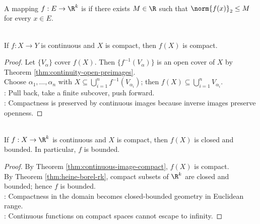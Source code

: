 \begin{definition} \label{def:bounded-mapping-into-rk} \\
A mapping $f:E\to\R^k$ is  if there exists $M\in\R$ such that $\norm{f(x)}_2\leq M$ for every $x\in E$.
\end{definition}

\begin{theorem} \label{thm:continuous-image-compact} \\
If $f:X\to Y$ is continuous and $X$ is compact, then $f(X)$ is compact.
\begin{proof}
Let $\{V_\alpha\}$ cover $f(X)$. Then $\{f^{-1}(V_\alpha)\}$ is an open cover of $X$ by Theorem \ref{thm:continuity-open-preimages}.\\
Choose $\alpha_1,\ldots,\alpha_n$ with $X\subseteq\bigcup_{i=1}^n f^{-1}(V_{\alpha_i})$; then $f(X)\subseteq\bigcup_{i=1}^n V_{\alpha_i}$.\\
: Pull back, take a finite subcover, push forward.\\
: Compactness is preserved by continuous images because inverse images preserve openness.
\end{proof}
\end{theorem}

\begin{corollary} \label{cor:continuous-rk-image-compact-closed-bounded} \\
If $f:X\to\R^k$ is continuous and $X$ is compact, then $f(X)$ is closed and bounded. In particular, $f$ is bounded.
\begin{proof}
By Theorem \ref{thm:continuous-image-compact}, $f(X)$ is compact.\\
By Theorem \ref{thm:heine-borel-rk}, compact subsets of $\R^k$ are closed and bounded; hence $f$ is bounded.\\
: Compactness in the domain becomes closed-bounded geometry in Euclidean range.\\
: Continuous functions on compact spaces cannot escape to infinity.
\end{proof}
\end{corollary}

